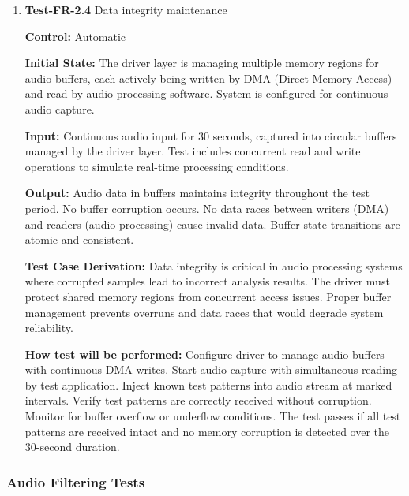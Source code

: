 \documentclass[12pt, titlepage]{article}
\begin{document}
\begin{enumerate}
\textbf{How test will be performed:}
Modify source code that inject specific faults.Execute test sequence and
capture return codes from driver API calls. Verify each return code matches
the expected error type.
Measure time from API call to return to confirm immediate propagation (less than
10 milliseconds). The test passes if all error conditions return correct,
specific error codes within timing constraints.

\item{\textbf{Test-FR-2.4} Data integrity maintenance\\}

\textbf{Control:} Automatic
					
\textbf{Initial State:} 
The driver layer is managing multiple memory regions for audio buffers, each
actively being written by DMA (Direct Memory Access) and read by audio
processing software. System is configured for continuous audio capture.
					
\textbf{Input:}
Continuous audio input for 30 seconds, captured into circular buffers managed by
the driver layer. Test includes concurrent read and write operations to simulate
real-time processing conditions.
					
\textbf{Output:}
Audio data in buffers maintains integrity throughout the test period. No buffer
corruption occurs. No data races
between writers (DMA) and readers (audio processing) cause invalid data. Buffer
state transitions are atomic and consistent.

\textbf{Test Case Derivation:} 
Data integrity is critical in audio processing systems where corrupted samples
lead to incorrect analysis results. The driver must protect shared memory
regions from concurrent access issues. Proper buffer management prevents
overruns and data races that would degrade system reliability.
					
\textbf{How test will be performed:}
Configure driver to manage audio buffers with continuous DMA writes. Start audio
capture with simultaneous reading by test application. Inject known test
patterns into audio stream at marked intervals. Verify test patterns are
correctly received without corruption. Monitor for buffer overflow or underflow
conditions. The test passes if all test patterns are received intact and no
memory corruption is detected over the 30-second duration.

\end{enumerate}

\subsubsection{Audio Filtering Tests}
\end{document}
